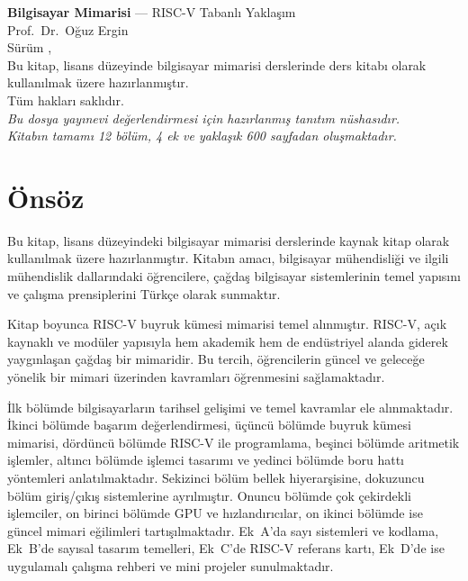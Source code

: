 \documentclass[12pt, a4paper, twoside, openright]{book}
\begin{document}
\frontmatter



\cleardoublepage
\thispagestyle{empty}
\vspace*{\fill}
\noindent
{\small
\textbf{Bilgisayar Mimarisi} --- RISC-V Tabanlı Yaklaşım\\[3pt]
Prof.\ Dr.\ Oğuz Ergin\\[6pt]
Sürüm \kitapsurum, \the\year\\[12pt]
Bu kitap, lisans düzeyinde bilgisayar mimarisi derslerinde ders kitabı
olarak kullanılmak üzere hazırlanmıştır.\\[6pt]
Tüm hakları saklıdır.\\[24pt]
\textit{Bu dosya yayınevi değerlendirmesi için hazırlanmış tanıtım nüshasıdır.\\
Kitabın tamamı 12 bölüm, 4 ek ve yaklaşık 600 sayfadan oluşmaktadır.}
}
\vspace{2cm}

\cleardoublepage
\chapter*{Önsöz}

Bu kitap, lisans düzeyindeki bilgisayar mimarisi derslerinde kaynak kitap olarak kullanılmak üzere hazırlanmıştır. Kitabın amacı, bilgisayar mühendisliği ve ilgili mühendislik dallarındaki öğrencilere, çağdaş bilgisayar sistemlerinin temel yapısını ve çalışma prensiplerini Türkçe olarak sunmaktır.

Kitap boyunca RISC-V buyruk kümesi mimarisi temel alınmıştır. RISC-V, açık kaynaklı ve modüler yapısıyla hem akademik hem de endüstriyel alanda giderek yaygınlaşan çağdaş bir mimaridir. Bu tercih, öğrencilerin güncel ve geleceğe yönelik bir mimari üzerinden kavramları öğrenmesini sağlamaktadır.

İlk bölümde bilgisayarların tarihsel gelişimi ve temel kavramlar ele alınmaktadır. İkinci bölümde başarım değerlendirmesi, üçüncü bölümde buyruk kümesi mimarisi, dördüncü bölümde RISC-V ile programlama, beşinci bölümde aritmetik işlemler, altıncı bölümde işlemci tasarımı ve yedinci bölümde boru hattı yöntemleri anlatılmaktadır. Sekizinci bölüm bellek hiyerarşisine, dokuzuncu bölüm giriş/çıkış sistemlerine ayrılmıştır. Onuncu bölümde çok çekirdekli işlemciler, on birinci bölümde GPU ve hızlandırıcılar, on ikinci bölümde ise güncel mimari eğilimleri tartışılmaktadır. Ek~A'da sayı sistemleri ve kodlama, Ek~B'de sayısal tasarım temelleri, Ek~C'de RISC-V referans kartı, Ek~D'de ise uygulamalı çalışma rehberi ve mini projeler sunulmaktadır.
\end{document}
